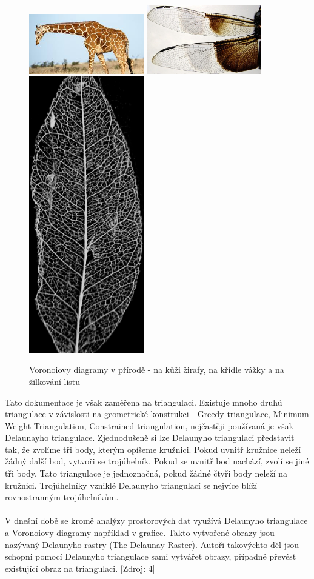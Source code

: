 \documentclass[a4paper, 12pt]{article}
\begin{document}
\begin{figure}[h!]
\centering
\includegraphics[width=5cm]{pictures/zirafa.jpg}
\includegraphics[width=5cm]{pictures/vazka.jpg}
\includegraphics[width=5cm]{pictures/list.jpg}
\caption{Voronoiovy diagramy v přírodě - na kůži žirafy, na křídle vážky a na žilkování listu}
\end{figure}


Tato dokumentace je však zaměřena na triangulaci. Existuje mnoho druhů triangulace v závislosti na geometrické konstrukci - Greedy triangulace, Minimum Weight Triangulation, Constrained triangulation, nejčastěji používaná je však Delaunayho triangulace.  Zjednodušeně si lze Delaunyho triangulaci představit tak, že zvolíme tři body, kterým opíšeme kružnici. Pokud uvnitř kružnice neleží žádný další bod, vytvoři se trojúhelník. Pokud se uvnitř bod nachází, zvolí se jiné tři body. Tato triangulace je jednoznačná, pokud žádné čtyři body neleží na kružnici. Trojúhelníky vzniklé Delaunyho triangulací se nejvíce blíží rovnostranným trojúhelníkům. \\
\\
V dnešní době se kromě analýzy prostorových dat využívá Delaunyho triangulace a Voronoiovy diagramy například v grafice. Takto vytvořené obrazy jsou nazývaný Delaunyho rastry (The Delaunay Raster). Autoři takovýchto děl jsou schopni pomocí Delaunyho triangulace sami vytvářet obrazy, případně převést existující obraz na triangulaci. [Zdroj: 4]
\end{document}
